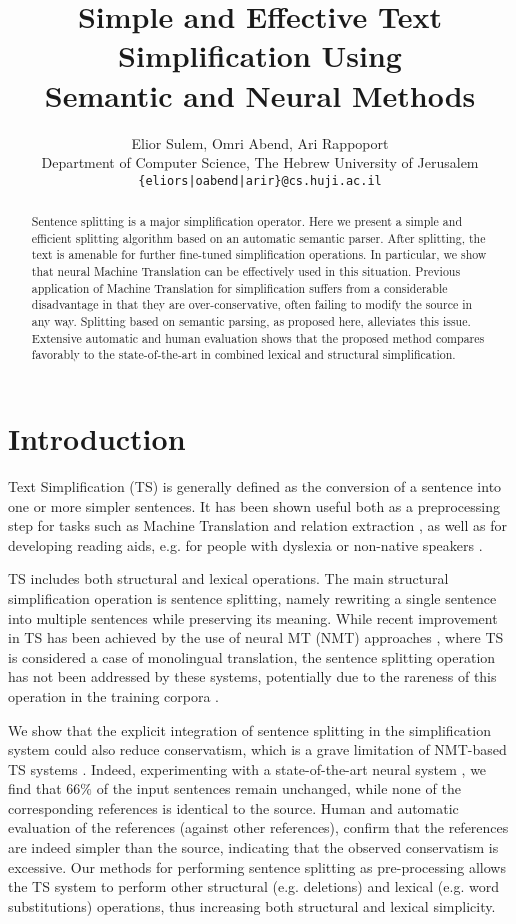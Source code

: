\documentclass[11pt,a4paper]{article}
\title{Simple and Effective Text Simplification Using\\
Semantic and Neural Methods}
\author{Elior Sulem, Omri Abend, Ari Rappoport \\
Department of Computer Science, The Hebrew University of Jerusalem\\
{\tt \{eliors|oabend|arir\}@cs.huji.ac.il}
}
\date{}
\begin{document}
\maketitle
\begin{abstract}
Sentence splitting is a major simplification operator. Here we present a simple and efficient splitting algorithm based on an automatic semantic parser. After splitting, the text is amenable for further fine-tuned simplification operations. In particular, we show that neural Machine Translation can be effectively used in this situation.
Previous application of Machine Translation for simplification suffers from a considerable disadvantage in that they are over-conservative, often failing to modify the source in any way. Splitting based on semantic parsing, as proposed here, alleviates this issue. 
Extensive automatic and human evaluation shows that the proposed method compares favorably to the state-of-the-art in combined lexical and structural simplification.

\end{abstract}

\section{Introduction} \label{sec:introduction}

Text Simplification (TS) is generally defined as the conversion of a sentence into one or more simpler sentences. 
It has been shown useful both as a preprocessing step for tasks such as Machine Translation \citep[MT;][]{M14,SP16} 
and relation extraction \citep{N16}, as well as for developing reading aids, e.g. for people with dyslexia \citep{R13} or non-native speakers \citep{S02}.

TS includes both structural and lexical operations. The main structural simplification operation is sentence splitting, namely 
rewriting a single sentence into multiple sentences while preserving its meaning.
While recent improvement in TS has been achieved by the use of neural MT (NMT) approaches \citep{Ni17,Z17,ZL17}, where TS is considered a case of monolingual translation, the sentence splitting operation has not been addressed by these systems, potentially due to the rareness of this operation in the training corpora \citep{NG14,Xu15}.

We show that the explicit integration of sentence splitting in the simplification system could also reduce conservatism, which is a grave limitation of NMT-based TS systems \citep{AM17}. Indeed, experimenting with a state-of-the-art neural system \citep{Ni17}, we find that 66$\%$ of the input sentences remain unchanged, while none of the corresponding references is identical to the source.
Human and automatic evaluation of the references (against other references), confirm that the references are indeed simpler than the source,
indicating that the observed conservatism is excessive. 
Our methods for performing sentence splitting as pre-processing allows the TS system to perform other structural (e.g. deletions) and lexical (e.g. word substitutions) operations, thus increasing both structural and lexical simplicity.
\end{document}
